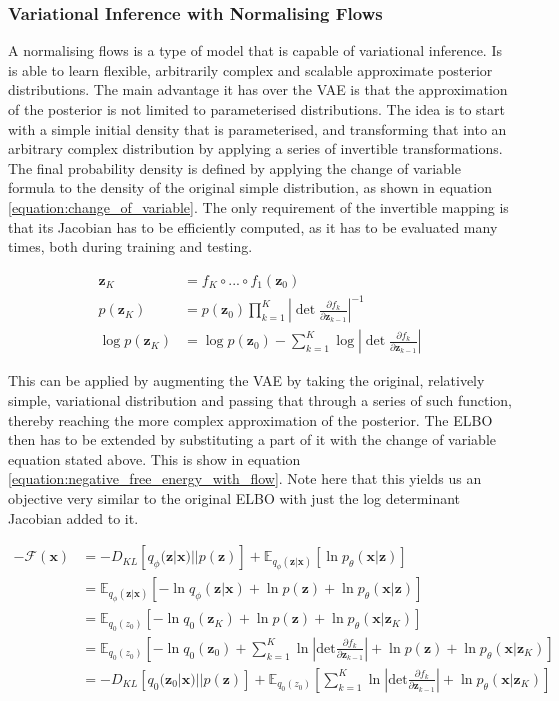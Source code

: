 \documentclass{article}
\newcommand{\E}{\mathbb{E}}
\newcommand{\bx}{\mathbf{x}}
\newcommand{\bz}{\mathbf{z}}
\newcommand{\parfrac}[2]{\frac{\partial #1}{\partial#2}}
\begin{document}
\subsubsection*{Variational Inference with Normalising Flows}
A normalising flows is a type of model that is capable of variational inference. Is is able to learn flexible, arbitrarily complex and scalable approximate posterior distributions. The main advantage it has over the VAE is that the approximation of the posterior is not limited to parameterised distributions. The idea is to start with a simple initial density that is parameterised, and transforming that into an arbitrary complex distribution by applying a series of invertible transformations. The final probability density is defined by applying the change of variable formula to the density of the original simple distribution, as shown in equation \ref{equation:change_of_variable}. The only requirement of the invertible mapping is that its Jacobian has to be efficiently computed, as it has to be evaluated many times, both during training and testing.

\begin{align}\label{equation:change_of_variable}
    \bz_K &= f_K \circ ... \circ f_1 (\bz_0)\\
    p(\bz_K) &= p(\bz_0) \prod\limits_{k=1}^K \left|\det \parfrac{f_k}{\bz_{k-1}} \right|^{-1}\\
    \log p(\bz_K) &= \log p(\bz_0) - \sum\limits_{k=1}^K \log \left|\det \parfrac{f_k}{\bz_{k-1}} \right|
\end{align}

\noindent
This can be applied by augmenting the VAE by taking the original, relatively simple, variational distribution and passing that through a series of such function, thereby reaching the more complex approximation of the posterior. The ELBO then has to be extended by substituting a part of it with the change of variable equation stated above. This is show in equation \ref{equation:negative_free_energy_with_flow}. Note here that this yields us an objective very similar to the original ELBO with just the log determinant Jacobian added to it.

\begin{equation}\label{equation:negative_free_energy_with_flow}
    \begin{split}
    -\mathcal{F}(\bx) &= -D_{KL}[q_\phi(\bz|\bx) || p(\bz)] + \E_{q_\phi(\bz|\bx)}[\ln p_\theta(\bx|\bz)]\\
    &= \E_{q_\phi(\bz|\bx)}[-\ln q_\phi(\bz|\bx) + \ln p(\bz) + \ln p_\theta(\bx|\bz)]\\
    &= \E_{q_0(z_0)}[-\ln q_0(\bz_K) + \ln p(\bz) + \ln p_\theta(\bx|\bz_K)]\\
    &= \E_{q_0(z_0)}[-\ln q_0(\bz_0) + \sum\limits^K_{k=1}\ln \left|\text{det} \parfrac{f_k}{\bz_{k-1}} \right| + \ln p(\bz) + \ln p_\theta(\bx|\bz_K)]\\
    &= -D_{KL}[q_0(\bz_0|\bx) || p(\bz)]+   \E_{q_0(z_0)}[\sum\limits^K_{k=1}\ln \left|\text{det} \parfrac{f_k}{\bz_{k-1}} \right| + \ln p_\theta(\bx|\bz_K)]\\
    \end{split}
\end{equation}
\end{document}
